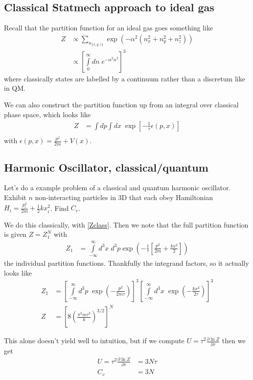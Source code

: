 \documentclass[10pt,twocolumn]{article}
\newcommand{\pd}[2]{\frac{\partial#1}{\partial#2}}
\begin{document}
\subsection{Classical Statmech approach to ideal gas}

Recall that the partition function for an ideal gas goes something like
\begin{align}
    Z &\propto \sum\limits_{n_{\{x,y,z\}}}^{} \exp\left( -\alpha^2(n_x^2 + n_y^2 + n_z^2) \right)\\
    &\propto \left[\int\limits_{0}^{\infty}dn\;e^{-\alpha^2 n^2}\right]^3
\end{align}
where classically states are labelled by a continuum rather than a discretum like in QM.

We can also construct the partition function up from an integral over classical phase space, which looks like
\begin{align}
    Z &= \int\limits_{}^{}dp\int\limits_{}^{}dx\;\exp\left[ -\frac{1}{\tau}\epsilon(p,x) \right]\label{Zclass}
\end{align}
with $\epsilon(p,x) = \frac{p^2}{2m} + V(x)$. 

\subsection{Harmonic Oscillator, classical/quantum}

Let's do a example problem of a classical and quantum harmonic oscillator. Exhibit $n$ non-interacting particles in 3D that each obey Hamiltonian $H_i = \frac{p_i^2}{2m} + \frac{1}{2}kx_i^2$. Find $C_v$.

We do this classically, with \eqref{Zclass}. Then we note that the full partition function is given $Z = Z_1^N$ with
\begin{align}
    Z_1 &= \int\limits_{-\infty}^{\infty} d^3x\;d^3p \exp\left( -\frac{1}{\tau}\left[ \frac{p^2}{2m} + \frac{kx^2}{2} \right] \right)
\end{align}
the individual partition functions. Thankfully the integrand factors, so it actually looks like
\begin{align}
    Z_1 &= \left[ \int\limits_{-\infty}^{\infty}d^3p\;\exp\left( -\frac{p^2}{2m\tau} \right) \right]^3\left[ \int\limits_{-\infty}^{\infty}d^3x\;\exp\left( -\frac{kx^2}{2\tau} \right) \right]^3\\
    Z &= \left[ 8\left( \frac{\pi^2 m\tau^2}{k} \right)^{3/2} \right]^N
\end{align}

This alone doesn't yield well to intuition, but if we compute $U = \tau^2 \pd{\ln Z}{\tau}$ then we get
\begin{align}
    U = \tau^2 \pd{\ln Z}{\tau} &= 3N\tau\\
    C_v &= 3N
\end{align}
\end{document}
